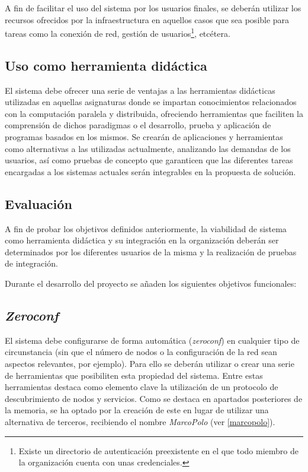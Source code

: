 A fin de facilitar el uso del sistema por los usuarios finales, se deberán utilizar los recursos ofrecidos por la infraestructura en aquellos casos que sea posible para tareas como la conexión de red, gestión de usuarios\footnote{Existe un directorio de autenticación preexistente en el que todo miembro de la organización cuenta con unas credenciales.}, etcétera.%

\subsection{Uso como herramienta didáctica}

El sistema debe ofrecer una serie de ventajas a las herramientas didácticas utilizadas en aquellas asignaturas donde se impartan conocimientos relacionados con la computación paralela y distribuida, ofreciendo herramientas que faciliten la comprensión de dichos paradigmas o el desarrollo, prueba y aplicación de programas basados en los mismos. Se crearán de aplicaciones y herramientas como alternativas a las utilizadas actualmente, analizando las demandas de los usuarios, así como pruebas de concepto que garanticen que las diferentes tareas encargadas a los sistemas actuales serán integrables en la propuesta de solución.

\subsection{Evaluación}

A fin de probar los objetivos definidos anteriormente, la viabilidad de sistema como herramienta didáctica y su integración en la organización deberán ser determinados por los diferentes usuarios de la misma y la realización de pruebas de integración.

Durante el desarrollo del proyecto se añaden los siguientes objetivos funcionales:

\subsection{\textit{Zeroconf}}

El sistema debe configurarse de forma automática (\textit{zeroconf}) en cualquier tipo de circunstancia (sin que el número de nodos o la configuración de la red sean aspectos relevantes, por ejemplo). Para ello se deberán utilizar o crear una serie de herramientas que posibiliten esta propiedad del sistema. Entre estas herramientas destaca como elemento clave la utilización de un protocolo de descubrimiento de nodos y servicios. Como se destaca en apartados posteriores de la memoria, se ha optado por la creación de este en lugar de utilizar una alternativa de terceros, recibiendo el nombre \textit{MarcoPolo} (ver \ref{marcopolo}).

